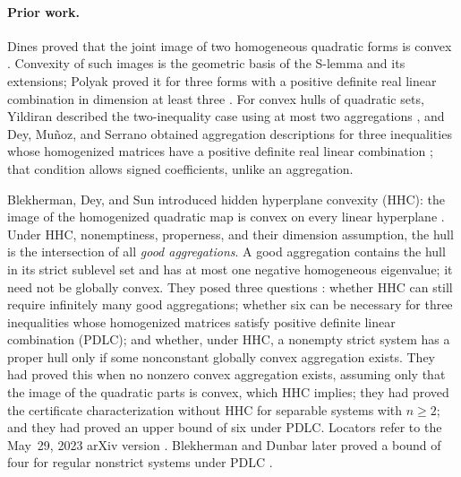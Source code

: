 \paragraph{Prior work.}
Dines proved that the joint image of two homogeneous quadratic forms is
convex \citep{Dines1941}. Convexity of such images is the geometric basis
of the S-lemma and its extensions; Polyak proved it for three forms with
a positive definite real linear combination in dimension at least three
\citep{Polyak1998}. For convex hulls of quadratic sets, Yildiran described the two-inequality case using at most
two aggregations \citep{Yildiran2009}, and Dey, Mu\~noz, and Serrano
obtained aggregation descriptions for three inequalities whose
homogenized matrices have a positive definite real linear combination
\citep{DMS2022}; that condition allows signed coefficients, unlike an
aggregation.

Blekherman, Dey, and Sun introduced hidden hyperplane convexity (HHC):
the image of the homogenized quadratic map is convex on every linear
hyperplane \citep{BDS2024,BDSpreprint}. Under HHC, nonemptiness,
properness, and their dimension assumption, the hull is the
intersection of all \emph{good aggregations}. A good aggregation
contains the hull in its strict sublevel set and has at most one
negative homogeneous eigenvalue; it need not be globally convex. They
posed three questions \citep[Conjectures~3.1--3.3]{BDSpreprint}:
whether HHC can still require infinitely many good aggregations; whether
six can be necessary for three inequalities whose homogenized matrices
satisfy positive definite linear combination (PDLC); and whether, under
HHC, a nonempty strict system has a proper hull only if some nonconstant
globally convex aggregation exists. They had proved this when no nonzero
convex aggregation exists, assuming only that the image of the quadratic
parts is convex, which HHC implies; they had proved the certificate
characterization without HHC for separable systems with $n\geq2$; and
they had proved an upper bound of six under PDLC. Locators refer to the May~29, 2023 arXiv version
\citep{BDSpreprint}. Blekherman and Dunbar later proved a bound of four for
regular nonstrict systems under PDLC \citep{BD2025,BDpreprint}.

